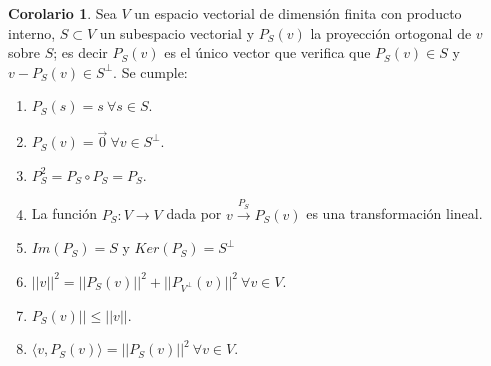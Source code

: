 \documentclass[10pt]{article}
\theoremstyle{definition}
\newtheorem{corollary}{Corolario}[theorem]
\begin{document}
\begin{corollary}
	Sea $V$ un espacio vectorial de dimensión finita con producto interno, $S\subset V$ un subespacio vectorial y $P_S(v)$ la proyección ortogonal de $v$ sobre $S$; es decir $P_S(v)$ es el único vector que verifica que $P_S(v)\in S$ y $v-P_S(v)\in S^\bot$. Se cumple:
	\begin{enumerate}
		\item $P_S(s)=s\ \forall s\in S$.
		\item $P_S(v)=\vec{0}\ \forall v\in S^\bot$.
		\item $P_S^2=P_S\circ P_S=P_S$.
		\item La función $P_S:V\to V$ dada por $v\xrightarrow{P_{S}} P_{S}( v)$ es una transformación lineal.
		\item $Im(P_S)=S$ y $Ker(P_S)=S^\bot$
		\item $||v||^2=||P_S(v)||^2+||P_{V^\bot}(v)||^2\ \forall v\in V$.
		\item $P_S(v)||\le ||v||$.
		\item $\langle v,P_S(v)\rangle = ||P_S(v)||^2\ \forall v\in V$.
	\end{enumerate}
\end{corollary}\newpage
\end{document}
